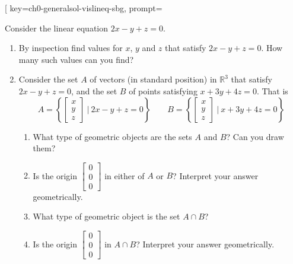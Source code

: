 



\begin{SaveQuestion}[
        key=ch0-generalsol-vislineq-sbg,
        prompt={Consider the linear equation $2x - y + z = 0$. 
        \begin{enumerate}	
        \item By inspection find values for $x$, $y$ and $z$ that satisfy $2x - y + z = 0$. How many such values can you find?
        \item Consider the set $A$ of vectors (in standard position) in $\mathbb R^3$ that satisfy $2x - y + z = 0$, and the set $B$ of points satisfying $x + 3y + 4 z = 0$. That is $$A=\left\{\begin{bmatrix} x\\y\\z \end{bmatrix}\:|\: 2x - y + z = 0\right\}\quad\quad  B=\left\{\begin{bmatrix} x\\y\\z \end{bmatrix}\:|\: x + 3y + 4 z = 0\right\}$$
            \begin{enumerate}
            \item What type of geometric objects are the sets  $A$ and $B$? Can you draw them?
            \item Is the origin $\begin{bmatrix} 0\\0\\0 \end{bmatrix}$ in either of $A$ or $B$? Interpret your answer geometrically.
            \item What type of  geometric object  is the  set $A \cap B$?
            \item Is the origin $\begin{bmatrix} 0\\0\\0 \end{bmatrix}$ in $A \cap B$?  Interpret your answer geometrically.

\end{enumerate}
\end{enumerate}}
\end{SaveQuestion}

